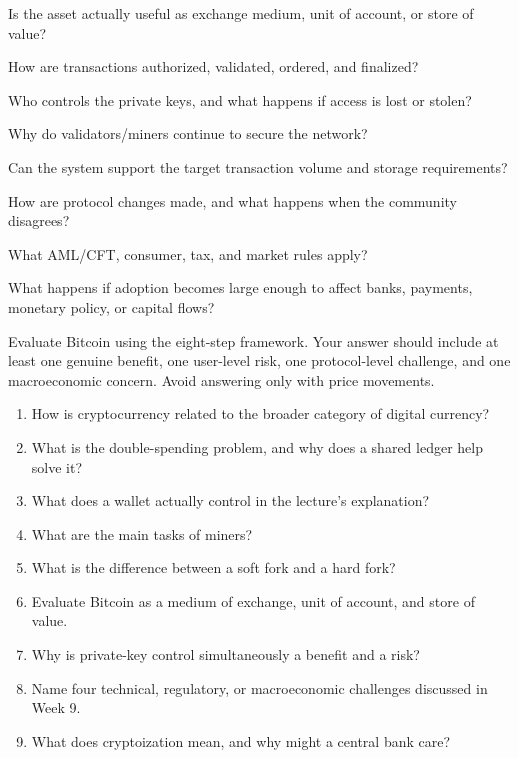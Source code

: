 \begin{mlsteps}
  \item {} Is the asset actually useful as exchange medium, unit of account, or store of value?
  \item {} How are transactions authorized, validated, ordered, and finalized?
  \item {} Who controls the private keys, and what happens if access is lost or stolen?
  \item {} Why do validators/miners continue to secure the network?
  \item {} Can the system support the target transaction volume and storage requirements?
  \item {} How are protocol changes made, and what happens when the community disagrees?
  \item {} What AML/CFT, consumer, tax, and market rules apply?
  \item {} What happens if adoption becomes large enough to affect banks, payments, monetary policy, or capital flows?
\end{mlsteps}

\begin{tryit}
Evaluate Bitcoin using the eight-step framework. Your answer should include at least one genuine benefit, one user-level risk, one protocol-level challenge, and one macroeconomic concern. Avoid answering only with price movements.
\end{tryit}

\begin{quickcheck}
\begin{enumerate}
  \item How is cryptocurrency related to the broader category of digital currency?
  \item What is the double-spending problem, and why does a shared ledger help solve it?
  \item What does a wallet actually control in the lecture's explanation?
  \item What are the main tasks of miners?
  \item What is the difference between a soft fork and a hard fork?
  \item Evaluate Bitcoin as a medium of exchange, unit of account, and store of value.
  \item Why is private-key control simultaneously a benefit and a risk?
  \item Name four technical, regulatory, or macroeconomic challenges discussed in Week 9.
  \item What does cryptoization mean, and why might a central bank care?
\end{enumerate}
\end{quickcheck}

